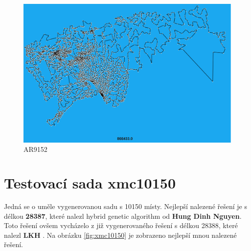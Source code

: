\begin{table}[H]
\centering
\caption{AR9152}
\end{table}

\begin{figure}[H]
    \centering
    \includegraphics[width=15cm]{obrazky-figures/AR9152.png}
    \caption{AR9152}
    \label{fig:AR9152}
\end{figure}




\section{Testovací sada xmc10150}
Jedná se o uměle vygenerovanou sadu s 10150 místy. Nejlepší nalezené řešení je s délkou \textbf{28387}, které nalezl hybrid genetic algorithm od \textbf{Hung Dinh Nguyen}. Toto řešení ovšem vycházelo z již vygenerovaného řešení s délkou 28388, které nalezl \textbf{LKH} \cite{xmc10150}. Na obrázku \ref{fig:xmc10150} je zobrazeno nejlepší mnou nalezené řešení.



